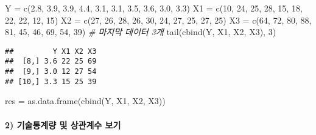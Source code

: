 \documentclass[
]{article}
\newenvironment{Shaded}{\begin{snugshade}}{\end{snugshade}}
\newcommand{\CommentTok}[1]{\textcolor[rgb]{0.56,0.35,0.01}{\textit{#1}}}
\newcommand{\DecValTok}[1]{\textcolor[rgb]{0.00,0.00,0.81}{#1}}
\newcommand{\FloatTok}[1]{\textcolor[rgb]{0.00,0.00,0.81}{#1}}
\newcommand{\FunctionTok}[1]{\textcolor[rgb]{0.00,0.00,0.00}{#1}}
\newcommand{\NormalTok}[1]{#1}
\newcommand{\OtherTok}[1]{\textcolor[rgb]{0.56,0.35,0.01}{#1}}
\begin{document}
\begin{Shaded}
\begin{Highlighting}[]
\NormalTok{Y }\OtherTok{=} \FunctionTok{c}\NormalTok{(}\FloatTok{2.8}\NormalTok{, }\FloatTok{3.9}\NormalTok{, }\FloatTok{3.9}\NormalTok{, }\FloatTok{4.4}\NormalTok{, }\FloatTok{3.1}\NormalTok{, }\FloatTok{3.1}\NormalTok{, }\FloatTok{3.5}\NormalTok{, }\FloatTok{3.6}\NormalTok{, }\FloatTok{3.0}\NormalTok{, }\FloatTok{3.3}\NormalTok{)}
\NormalTok{X1 }\OtherTok{=} \FunctionTok{c}\NormalTok{(}\DecValTok{10}\NormalTok{, }\DecValTok{24}\NormalTok{, }\DecValTok{25}\NormalTok{, }\DecValTok{28}\NormalTok{, }\DecValTok{15}\NormalTok{, }\DecValTok{18}\NormalTok{, }\DecValTok{22}\NormalTok{, }\DecValTok{22}\NormalTok{, }\DecValTok{12}\NormalTok{, }\DecValTok{15}\NormalTok{)}
\NormalTok{X2 }\OtherTok{=} \FunctionTok{c}\NormalTok{(}\DecValTok{27}\NormalTok{, }\DecValTok{26}\NormalTok{, }\DecValTok{28}\NormalTok{, }\DecValTok{26}\NormalTok{, }\DecValTok{30}\NormalTok{, }\DecValTok{24}\NormalTok{, }\DecValTok{27}\NormalTok{, }\DecValTok{25}\NormalTok{, }\DecValTok{27}\NormalTok{, }\DecValTok{25}\NormalTok{)}
\NormalTok{X3 }\OtherTok{=} \FunctionTok{c}\NormalTok{(}\DecValTok{64}\NormalTok{, }\DecValTok{72}\NormalTok{, }\DecValTok{80}\NormalTok{, }\DecValTok{88}\NormalTok{, }\DecValTok{81}\NormalTok{, }\DecValTok{45}\NormalTok{, }\DecValTok{46}\NormalTok{, }\DecValTok{69}\NormalTok{, }\DecValTok{54}\NormalTok{, }\DecValTok{39}\NormalTok{)}
\CommentTok{\# 마지막 데이터 3개}
\FunctionTok{tail}\NormalTok{(}\FunctionTok{cbind}\NormalTok{(Y, X1, X2, X3), }\DecValTok{3}\NormalTok{) }
\end{Highlighting}
\end{Shaded}

\begin{verbatim}
##         Y X1 X2 X3
##  [8,] 3.6 22 25 69
##  [9,] 3.0 12 27 54
## [10,] 3.3 15 25 39
\end{verbatim}

\begin{Shaded}
\begin{Highlighting}[]
\NormalTok{res }\OtherTok{=} \FunctionTok{as.data.frame}\NormalTok{(}\FunctionTok{cbind}\NormalTok{(Y, X1, X2, X3))}
\end{Highlighting}
\end{Shaded}

\hypertarget{uxae30uxc220uxd1b5uxacc4uxb7c9-uxbc0f-uxc0c1uxad00uxacc4uxc218-uxbcf4uxae30}{%
\paragraph{2) 기술통계량 및 상관계수
보기}\label{uxae30uxc220uxd1b5uxacc4uxb7c9-uxbc0f-uxc0c1uxad00uxacc4uxc218-uxbcf4uxae30}}
\end{document}
